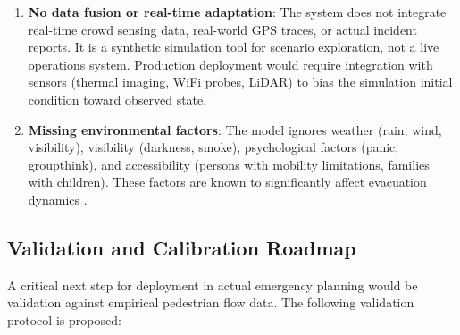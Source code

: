\documentclass[conference]{IEEEtran}
\begin{document}
\begin{enumerate}
\item \textbf{No data fusion or real-time adaptation}: The system does not integrate real-time crowd sensing data, real-world GPS traces, or actual incident reports. It is a synthetic simulation tool for scenario exploration, not a live operations system. Production deployment would require integration with sensors (thermal imaging, WiFi probes, LiDAR) to bias the simulation initial condition toward observed state.

\item \textbf{Missing environmental factors}: The model ignores weather (rain, wind, visibility), visibility (darkness, smoke), psychological factors (panic, groupthink), and accessibility (persons with mobility limitations, families with children). These factors are known to significantly affect evacuation dynamics \cite{duives2015agent}.
\end{enumerate}

\subsection{Validation and Calibration Roadmap}

A critical next step for deployment in actual emergency planning would be validation against empirical pedestrian flow data. The following validation protocol is proposed:
\end{document}
